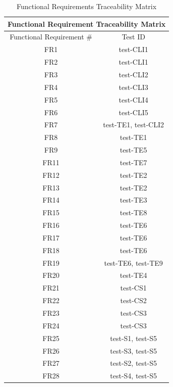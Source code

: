 \documentclass[12pt, titlepage]{article}
\begin{document}
\begin{table}[H]
    \centering
\begin{tabular}{|c|c|}
\hline
\multicolumn{2}{|c|}{Functional Requirement Traceability Matrix} \\ \hline
Functional Requirement \# & Test ID \\ \hline
FR1 & test-CLI1 \\ \hline
FR2 & test-CLI1 \\ \hline
FR3 & test-CLI2 \\ \hline
FR4 & test-CLI3 \\ \hline
FR5 & test-CLI4 \\ \hline
FR6 & test-CLI5 \\ \hline
FR7 & test-TE1, test-CLI2 \\ \hline
FR8 & test-TE1 \\ \hline
FR9 & test-TE5 \\ \hline
FR11 & test-TE7 \\ \hline
FR12 & test-TE2 \\ \hline
FR13 & test-TE2 \\ \hline
FR14 & test-TE3 \\ \hline
FR15 & test-TE8 \\ \hline
FR16 & test-TE6 \\ \hline
FR17 & test-TE6 \\ \hline
FR18 & test-TE6 \\ \hline
FR19 & test-TE6, test-TE9 \\ \hline
FR20 & test-TE4 \\ \hline
FR21 & test-CS1 \\ \hline
FR22 & test-CS2 \\ \hline
FR23 & test-CS3 \\ \hline
FR24 & test-CS3 \\ \hline
FR25 & test-S1, test-S5 \\ \hline
FR26 & test-S3, test-S5 \\ \hline
FR27 & test-S2, test-S5 \\ \hline
FR28 & test-S4, test-S5 \\  \hline
\end{tabular}
    \caption{Functional Requirements Traceability Matrix}
    \label{tab:frtrace}
\end{table}
\end{document}
